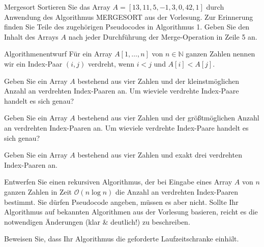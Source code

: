 \documentclass{exercisesheet}
\begin{document}
\begin{exercise}{Mergesort}
  Sortieren Sie das Array $A = [13,11,5, -1,3,0,42,1]$ durch Anwendung des Algorithmus MERGESORT aus der Vorlesung. Zur Erinnerung finden Sie Teile des zugehörigen Pseudocodes in Algorithmus 1. Geben Sie den Inhalt des Arrays $A$ nach jeder Durchführung der Merge-Operation in Zeile 5 an.
  \begin{algorithm}[ht]
    \caption{MERGESORT($A, l, r$)}
  \end{algorithm}
\end{exercise}

\begin{eexercises}{Algorithmenentwurf}{
    Für ein Array $A[1, \ldots, n]$ von $n \in \mathbb{N}$ ganzen Zahlen nennen wir ein Index-Paar $(i, j)$ verdreht, wenn $i < j$ und $A[i] < A[j]$.
  }
  \item Geben Sie ein Array $A$ bestehend aus vier Zahlen und der kleinstmöglichen Anzahl an verdrehten Index-Paaren an. Um wieviele verdrehte Index-Paare handelt es sich genau?
  \item Geben Sie ein Array $A$ bestehend aus vier Zahlen und der größtmöglichen Anzahl an verdrehten Index-Paaren an. Um wieviele verdrehte Index-Paare handelt es sich genau?
  \item Geben Sie ein Array $A$ bestehend aus vier Zahlen und exakt drei verdrehten Index-Paaren an.
  \item Entwerfen Sie einen rekursiven Algorithmus, der bei Eingabe eines Array $A$ von $n$ ganzen Zahlen in Zeit $\mathcal{O}(n \log n)$ die Anzahl an verdrehten Index-Paaren bestimmt. Sie dürfen Pseudocode angeben, müssen es aber nicht. Sollte Ihr Algorithmus auf bekannten Algorithmen aus der Vorlesung basieren, reicht es die notwendigen Änderungen (klar \& deutlich!) zu beschreiben.
  \item Beweisen Sie, dass Ihr Algorithmus die geforderte Laufzeitschranke einhält.
\end{eexercises}
\end{document}

